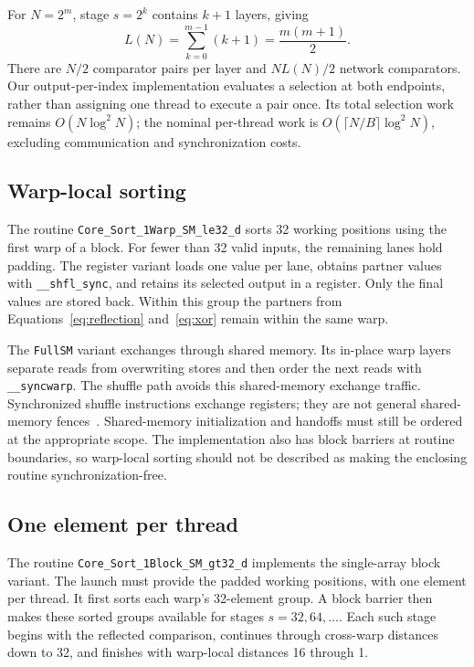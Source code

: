 \documentclass[fleqn,10pt,lineno]{wlpeerj}
\begin{document}
For $N=2^m$, stage $s=2^k$ contains $k+1$ layers, giving
\begin{equation}
 L(N)=\sum_{k=0}^{m-1}(k+1)=\frac{m(m+1)}{2}.
\end{equation}
There are $N/2$ comparator pairs per layer and $NL(N)/2$ network comparators. Our output-per-index implementation evaluates a selection at both endpoints, rather than assigning one thread to execute a pair once. Its total selection work remains $O(N\log^2N)$; the nominal per-thread work is $O(\lceil N/B\rceil\log^2N)$, excluding communication and synchronization costs.

\subsection*{Warp-local sorting}
The routine \texttt{Core\_Sort\_1Warp\_SM\_le32\_d} sorts 32 working positions using the first warp of a block. For fewer than 32 valid inputs, the remaining lanes hold padding. The register variant loads one value per lane, obtains partner values with \texttt{\_\_shfl\_sync}, and retains its selected output in a register. Only the final values are stored back. Within this group the partners from Equations~\ref{eq:reflection} and~\ref{eq:xor} remain within the same warp.

The \texttt{FullSM} variant exchanges through shared memory. Its in-place warp layers separate reads from overwriting stores and then order the next reads with \texttt{\_\_syncwarp}. The shuffle path avoids this shared-memory exchange traffic. Synchronized shuffle instructions exchange registers; they are not general shared-memory fences~\citep{nvidiaCudaGuide}. Shared-memory initialization and handoffs must still be ordered at the appropriate scope. The implementation also has block barriers at routine boundaries, so warp-local sorting should not be described as making the enclosing routine synchronization-free.

\subsection*{One element per thread}
The routine \texttt{Core\_Sort\_1Block\_SM\_gt32\_d} implements the single-array block variant. The launch must provide the padded working positions, with one element per thread. It first sorts each warp's 32-element group. A block barrier then makes these sorted groups available for stages $s=32,64,\ldots$. Each such stage begins with the reflected comparison, continues through cross-warp distances down to 32, and finishes with warp-local distances 16 through 1.
\end{document}
